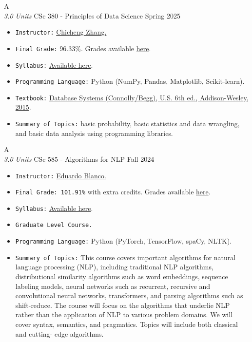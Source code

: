 \cventry
{A \\ \small{\textit{3.0 Units}}}
{CSc 380 - Principles of Data Science}
{Spring 2025}
{}
{}
{
  \begin{itemize}
    \item \texttt{Instructor:} \href{https://zcc1307.github.io/}{Chicheng Zhang.}
    \item \texttt{Final Grade:} 96.33\%. Grades available \href{https://mhrezaei.com/assets/cv/courses/Spring2025/CSC380/Grades.pdf}{here}.
    \item \texttt{Syllabus:} \href{https://mhrezaei.com/assets/cv/courses/Spring2025/CSC380/Syllabus.pdf}{Available here}.
    \item \texttt{Programming Language:} Python (NumPy, Pandas, Matplotlib, Scikit-learn).
    \item \texttt{Textbook:} \href{https://media.pearsoncmg.com/aw/wps-wraps/ecs_connollyb_database_6/cw/}{Database Systems (Connolly/Begg), U.S. 6th ed., Addison-Wesley, 2015}.
    \item \texttt{Summary of Topics:} basic probability, basic statistics and data wrangling, and basic data analysis using programming libraries.
  \end{itemize}
}

\cventry
{A \\ \small{\textit{3.0 Units}}}
{CSc 585 -  Algorithms for NLP}
{Fall 2024}
{}
{}
{
  \begin{itemize}
    \item \texttt{Instructor:} \href{https://eduardoblanco.github.io/}{Eduardo Blanco.}
    \item \texttt{Final Grade: 101.91\%} with extra credits. Grades available \href{https://mhrezaei.com/assets/cv/courses/Fall2024/CSC585/Grades.pdf}{here}.
    \item \texttt{Syllabus:} \href{https://mhrezaei.com/assets/cv/courses/Fall2024/CSC585/Syllabus.pdf}{Available here}.
    \item \texttt{Graduate Level Course.}
    \item \texttt{Programming Language:} Python (PyTorch, TensorFlow, spaCy, NLTK).
    \item \texttt{Summary of Topics:} This course covers important algorithms for natural language processing (NLP), including
    traditional NLP algorithms, distributional similarity algorithms such as word embeddings,
    sequence labeling models, neural networks such as recurrent, recursive and convolutional neural
    networks, transformers, and parsing algorithms such as shift-reduce. The course will focus on
    the algorithms that underlie NLP rather than the application of NLP to various problem domains.
    We will cover syntax, semantics, and pragmatics. Topics will include both classical and cutting-
    edge algorithms.
  \end{itemize}
}

